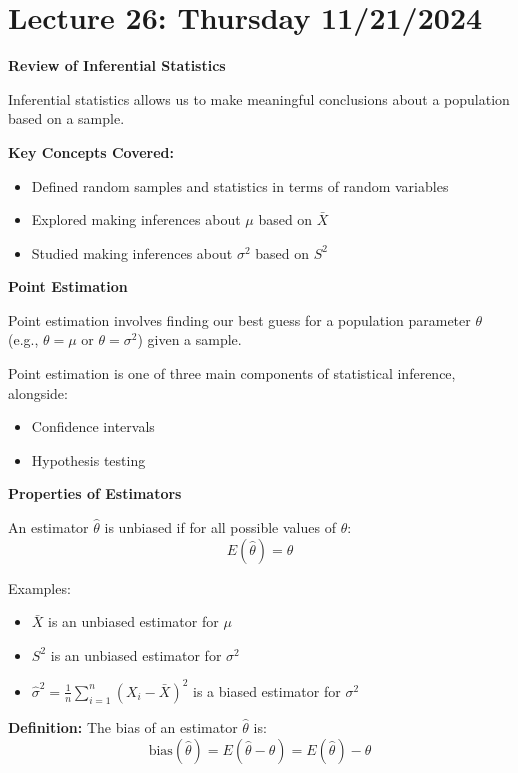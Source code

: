\documentclass{article}
\begin{document}
    \section*{Lecture 26: Thursday 11/21/2024}

   \textbf{Review of Inferential Statistics}
   
   Inferential statistics allows us to make meaningful conclusions about a population based on a sample.
   
   \textbf{Key Concepts Covered:}
   \begin{itemize}
       \item Defined random samples and statistics in terms of random variables
       \item Explored making inferences about $\mu$ based on $\bar{X}$
       \item Studied making inferences about $\sigma^2$ based on $S^2$
   \end{itemize}
   
   \textbf{Point Estimation}
   
   Point estimation involves finding our best guess for a population parameter $\theta$ (e.g., $\theta = \mu$ or $\theta = \sigma^2$) given a sample.
   
   Point estimation is one of three main components of statistical inference, alongside:
   \begin{itemize}
       \item Confidence intervals
       \item Hypothesis testing
   \end{itemize}
   
   \textbf{Properties of Estimators}
   
   An estimator $\hat{\theta}$ is unbiased if for all possible values of $\theta$:
   \[E(\hat{\theta}) = \theta\]
   
   Examples:
   \begin{itemize}
       \item $\bar{X}$ is an unbiased estimator for $\mu$
       \item $S^2$ is an unbiased estimator for $\sigma^2$
       \item $\hat{\sigma}^2 = \frac{1}{n} \sum_{i=1}^n (X_i - \bar{X})^2$ is a biased estimator for $\sigma^2$
   \end{itemize}
   
   
   \textbf{Definition:} The bias of an estimator $\hat{\theta}$ is:
   \[\text{bias}(\hat{\theta}) = E(\hat{\theta} - \theta) = E(\hat{\theta}) - \theta\]
\end{document}
